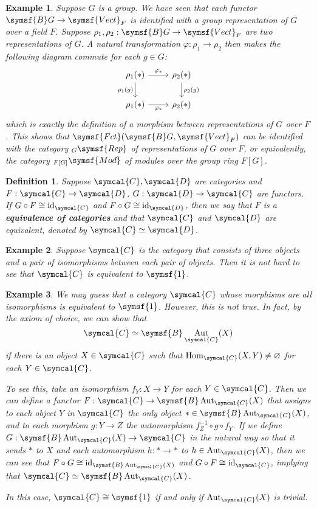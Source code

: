 \documentclass{article}
\theoremstyle{theorem}
\newtheorem{definition}{Definition}[section]
\newtheorem{example}{Example}[section]
\theoremstyle{remark}
\def\calC{{\symcal{C}}}
\def\calD{{\symcal{D}}}
\DeclareMathOperator{\Hom}{Hom}
\DeclareMathOperator{\Aut}{Aut}
\DeclareMathOperator{\id}{id}
\begin{document}
\begin{example}
    Suppose $G$ is a group. We have seen that each functor $\symsf{B}G \to \symsf{Vect}_F$ is identified with a group representation of $G$ over a field $F$. Suppose $\rho_1, \rho_2 : \symsf{B}G \to \symsf{Vect}_F$ are two representations of $G$. A natural transformation $\varphi : \rho_1 \to \rho_2$ then makes the following diagram commute for each $g \in G$:
    $$\begin{tikzcd}
        {\rho_1(\ast)} & {\rho_2(\ast)} \\
        {\rho_1(\ast)} & {\rho_2(\ast)}
        \arrow["{\varphi_\ast}", from=1-1, to=1-2]
        \arrow["{\rho_1(g)}"', from=1-1, to=2-1]
        \arrow["{\rho_2(g)}", from=1-2, to=2-2]
        \arrow["{\varphi_\ast}"', from=2-1, to=2-2]
    \end{tikzcd}$$
    which is exactly the definition of a morphism between representations of $G$ over $F$. This shows that $\symsf{Fct}(\symsf{B}G, \symsf{Vect}_F)$ can be identified with the category $_G\symsf{Rep}$ of representations of $G$ over $F$, or equivalently, the category $_{F[G]}\symsf{Mod}$ of modules over the group ring $F[G]$. 
\end{example}

\begin{definition}
    Suppose $\calC, \calD$ are categories and $F : \calC \to \calD$, $G : \calD \to \calC$ are functors. If $G \circ F \cong \id_\calC$ and $F \circ G \cong \id_\calD$, then we say that $F$ is a \textbf{equivalence of categories} and that $\calC$ and $\calD$ are equivalent, denoted by $\calC \simeq \calD$.
\end{definition}

\begin{example}
    Suppose $\calC$ is the category that consists of three objects and a pair of isomorphisms between each pair of objects. Then it is not hard to see that $\calC$ is equivalent to $\symsf{1}$.
\end{example}

\begin{example}
    We may guess that a category $\calC$ whose morphisms are all isomorphisms is equivalent to $\symsf{1}$. However, this is not true. In fact, by the axiom of choice, we can show that $$\calC \simeq \symsf{B}\Aut_\calC(X)$$ if there is an object $X \in \calC$ such that $\Hom_\calC(X, Y) \neq \varnothing$ for each $Y \in \calC$.

    To see this, take an isomorphism $f_Y : X \to Y$ for each $Y \in \calC$. Then we can define a functor $F : \calC \to \symsf{B}\Aut_\calC(X)$ that assigns to each object $Y$ in $\calC$ the only object $\ast \in \symsf{B}\Aut_\calC(X)$, and to each morphism $g : Y \to Z$ the automorphism $f_Z^{-1} \circ g \circ f_Y$. If we define $G : \symsf{B}\Aut_\calC(X) \to \calC$ in the natural way so that it sends $\ast$ to $X$ and each automorphism $h : \ast \to \ast$ to $h \in \Aut_\calC(X)$, then we can see that $F \circ G \cong \id_{\symsf{B}\Aut_\calC(X)}$ and $G \circ F \cong \id_\calC$, implying that $\calC \simeq \symsf{B}\Aut_\calC(X)$.

    In this case, $\calC \cong \symsf{1}$ if and only if $\Aut_\calC(X)$ is trivial. 
\end{example}
\end{document}
